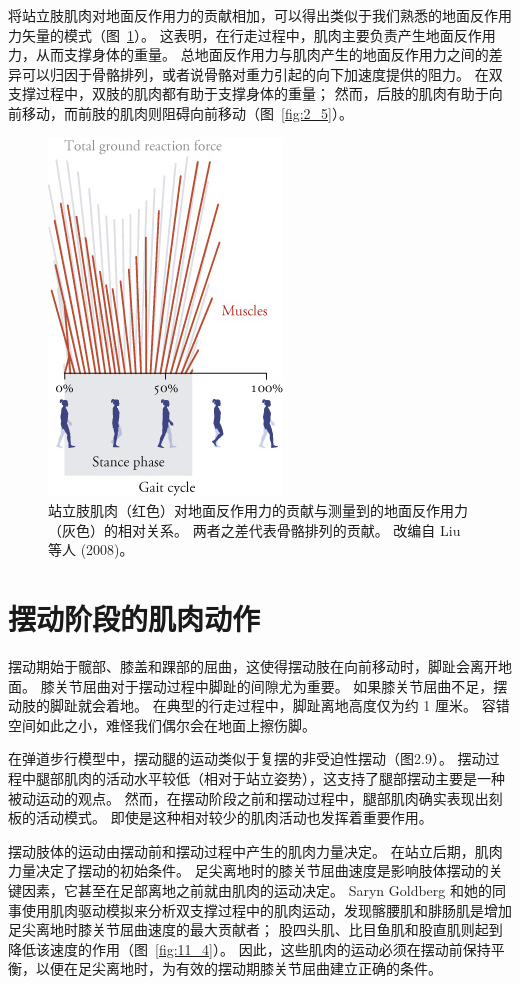 将站立肢肌肉对地面反作用力的贡献相加，可以得出类似于我们熟悉的地面反作用力矢量的模式（图~\ref{fig:11_3}）。
这表明，在行走过程中，肌肉主要负责产生地面反作用力，从而支撑身体的重量。
总地面反作用力与肌肉产生的地面反作用力之间的差异可以归因于骨骼排列，或者说骨骼对重力引起的向下加速度提供的阻力。
在双支撑过程中，双肢的肌肉都有助于支撑身体的重量；
然而，后肢的肌肉有助于向前移动，而前肢的肌肉则阻碍向前移动（图~\ref{fig:2_5}）。


\begin{figure}[!htb]
	\centering
	\includegraphics[width=0.4\linewidth]{chap11/11_3}
	\caption{站立肢肌肉（红色）对地面反作用力的贡献与测量到的地面反作用力（灰色）的相对关系。
		两者之差代表骨骼排列的贡献。
		改编自 Liu 等人 (2008)。 \label{fig:11_3}}
\end{figure}


\section{摆动阶段的肌肉动作}

摆动期始于髋部、膝盖和踝部的屈曲，这使得摆动肢在向前移动时，脚趾会离开地面。
膝关节屈曲对于摆动过程中脚趾的间隙尤为重要。
如果膝关节屈曲不足，摆动肢的脚趾就会着地。
在典型的行走过程中，脚趾离地高度仅为约 1 厘米。
容错空间如此之小，难怪我们偶尔会在地面上擦伤脚。


在弹道步行模型中，摆动腿的运动类似于复摆的非受迫性摆动（图2.9）。
摆动过程中腿部肌肉的活动水平较低（相对于站立姿势），这支持了腿部摆动主要是一种被动运动的观点。
然而，在摆动阶段之前和摆动过程中，腿部肌肉确实表现出刻板的活动模式。
即使是这种相对较少的肌肉活动也发挥着重要作用。


摆动肢体的运动由摆动前和摆动过程中产生的肌肉力量决定。
在站立后期，肌肉力量决定了摆动的初始条件。
足尖离地时的膝关节屈曲速度是影响肢体摆动的关键因素，它甚至在足部离地之前就由肌肉的运动决定。
Saryn Goldberg 和她的同事使用肌肉驱动模拟来分析双支撑过程中的肌肉运动，发现髂腰肌和腓肠肌是增加足尖离地时膝关节屈曲速度的最大贡献者；
股四头肌、比目鱼肌和股直肌则起到降低该速度的作用（图~\ref{fig:11_4}）。
因此，这些肌肉的运动必须在摆动前保持平衡，以便在足尖离地时，为有效的摆动期膝关节屈曲建立正确的条件。


